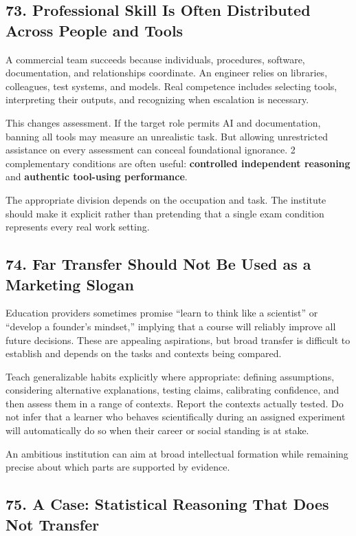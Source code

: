 \subsection*{73. Professional Skill Is Often Distributed Across People and Tools}

A commercial team succeeds because individuals, procedures, software, documentation, and relationships coordinate. An engineer relies on libraries, colleagues, test systems, and models. Real competence includes selecting tools, interpreting their outputs, and recognizing when escalation is necessary.

This changes assessment. If the target role permits AI and documentation, banning all tools may measure an unrealistic task. But allowing unrestricted assistance on every assessment can conceal foundational ignorance. 2 complementary conditions are often useful: \textbf{controlled independent reasoning} and \textbf{authentic tool-using performance}.

The appropriate division depends on the occupation and task. The institute should make it explicit rather than pretending that a single exam condition represents every real work setting.

\subsection*{74. Far Transfer Should Not Be Used as a Marketing Slogan}

Education providers sometimes promise ``learn to think like a scientist'' or ``develop a founder's mindset,'' implying that a course will reliably improve all future decisions. These are appealing aspirations, but broad transfer is difficult to establish and depends on the tasks and contexts being compared.

Teach generalizable habits explicitly where appropriate: defining assumptions, considering alternative explanations, testing claims, calibrating confidence, and then assess them in a range of contexts. Report the contexts actually tested. Do not infer that a learner who behaves scientifically during an assigned experiment will automatically do so when their career or social standing is at stake.

An ambitious institution can aim at broad intellectual formation while remaining precise about which parts are supported by evidence.

\subsection*{75. A Case: Statistical Reasoning That Does Not Transfer}


